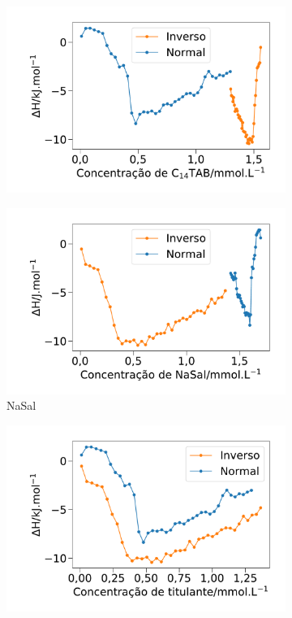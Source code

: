 		\begin{figure}
			\centering
			\begin{subfigure}{0.3\textwidth}
				\centering
				\includegraphics[width=\linewidth]{imagens/itc/itc_inverso_normal_base_ttab}
				\caption{\TTAB{}}
				\label{fig:itc_inverso_normal_base_ttab}
			\end{subfigure} %
			\begin{subfigure}{0.3\textwidth}
				\centering
				\includegraphics[width=\linewidth]{imagens/itc/itc_inverso_normal_base_nasal}
				\caption{NaSal}
				\label{fig:itc_inverso_normal_base_nasal}
			\end{subfigure} %
			\begin{subfigure}{0.3\textwidth}
				\centering
				\includegraphics[width=\linewidth]{imagens/itc/itc_inverso_normal_basecomum}

\end{subfigure}
\end{figure}
